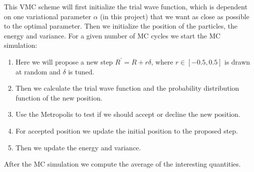 \documentclass[12pt,a4paper,english]{article}
\begin{document}
This VMC scheme will first initialize the trial wave function, which is dependent on one variational parameter $\alpha$ (in this project) that we want as close as possible to the optimal parameter. Then we initialize the position of the particles, the energy and variance. For a given number of MC cycles we start the MC simulation:
\begin{enumerate}
	\item Here we will propose a new step $R^{\prime}=R+r\delta$, where $r\in[-0.5,0.5]$ is drawn at random and $\delta$ is tuned. 
	\item Then we calculate the trial wave function and the probability distribution function of the new position.
	\item Use the Metropolis to test if we should accept or decline the new position.
	\item For accepted position we update the initial position to the proposed step.
	\item Then we update the energy and variance.
\end{enumerate} 
After the MC simulation we compute the average of the interesting quantities. 
\end{document}
